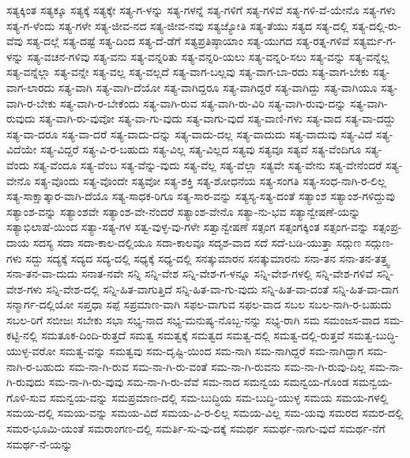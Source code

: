 {ಸತ್ಯಕ್ಕಿಂತ
ಸತ್ಯಕ್ಕೂ
ಸತ್ಯಕ್ಕೆ
ಸತ್ಯಕ್ಕೇ
ಸತ್ಯ-ಗ-ಳನ್ನು
ಸತ್ಯ-ಗಳನ್ನೆ
ಸತ್ಯ-ಗಳಿಗೆ
ಸತ್ಯ-ಗಳಿವೆ
ಸತ್ಯ-ಗಳಿ-ವೆ-ಯೇನೊ
ಸತ್ಯ-ಗಳು
ಸತ್ಯ-ಗ-ಳೆಂದು
ಸತ್ಯ-ಗಳೇ
ಸತ್ಯ-ಜೀವ-ನದ
ಸತ್ಯ-ಜೀವ-ನವು
ಸತ್ಯಜ್ಯೋತಿ
ಸತ್ಯ-ತೆಯು
ಸತ್ಯದ
ಸತ್ಯ-ದಲ್ಲಿ
ಸತ್ಯ-ದಲ್ಲಿ-ರು-ವೆವು
ಸತ್ಯ-ದಲ್ಲೆ
ಸತ್ಯ-ದಷ್ಟೆ
ಸತ್ಯ-ದಿಂದ
ಸತ್ಯ-ದೆ-ಡೆಗೆ
ಸತ್ಯಪ್ರತಿಷ್ಠಾಯಾಂ
ಸತ್ಯ-ಯುಗದ
ಸತ್ಯ-ರತ್ನ-ಗಳಿವೆ
ಸತ್ಯರ್ಮ-ಗ-ಳನ್ನು
ಸತ್ಯ-ವಚನ-ಗಳಿವು
ಸತ್ಯ-ವನು
ಸತ್ಯ-ವನ್ನರಿತು
ಸತ್ಯ-ವನ್ನರಿ-ಯಲು
ಸತ್ಯ-ವನ್ನರಿ-ಸಲು
ಸತ್ಯ-ವನ್ನು
ಸತ್ಯ-ವನ್ನೆಲ್ಲ
ಸತ್ಯ-ವನ್ನೆಲ್ಲಾ
ಸತ್ಯ-ವನ್ನೇ
ಸತ್ಯ-ವಲ್ಲ
ಸತ್ಯ-ವಲ್ಲದೆ
ಸತ್ಯ-ವಾಗ-ಬಲ್ಲವು
ಸತ್ಯ-ವಾಗ-ಬಾ-ರದು
ಸತ್ಯ-ವಾಗ-ಬೇಕು
ಸತ್ಯ-ವಾಗ-ಲಾರದು
ಸತ್ಯ-ವಾಗಿ
ಸತ್ಯ-ವಾಗಿ-ದೆಯೋ
ಸತ್ಯ-ವಾಗಿದ್ದರೂ
ಸತ್ಯ-ವಾಗಿದ್ದರೆ
ಸತ್ಯ-ವಾಗಿದ್ದು
ಸತ್ಯ-ವಾಗಿಯೂ
ಸತ್ಯ-ವಾಗಿ-ರ-ಬೇಕು
ಸತ್ಯ-ವಾಗಿ-ರ-ಬೇಕೆಂದು
ಸತ್ಯ-ವಾಗಿ-ರುವ
ಸತ್ಯ-ವಾಗಿ-ರು-ವಿರಿ
ಸತ್ಯ-ವಾಗಿ-ರುವು-ದನ್ನು
ಸತ್ಯ-ವಾಗಿ-ರುವುದು
ಸತ್ಯ-ವಾಗಿ-ರು-ವುವೋ
ಸತ್ಯ-ವಾ-ಗು-ವುದು
ಸತ್ಯ-ವಾಗು-ವುದೆ
ಸತ್ಯ-ವಾಣಿ-ಗಳು
ಸತ್ಯ-ವಾದ
ಸತ್ಯ-ವಾ-ದದ್ದು
ಸತ್ಯ-ವಾ-ದರೂ
ಸತ್ಯ-ವಾ-ದರೆ
ಸತ್ಯ-ವಾದು-ದನ್ನು
ಸತ್ಯ-ವಾದು-ದಲ್ಲ
ಸತ್ಯ-ವಾದುದು
ಸತ್ಯ-ವಾದುವು
ಸತ್ಯ-ವಿದೆ
ಸತ್ಯ-ವಿದೆಯೇ
ಸತ್ಯ-ವಿದ್ದರೆ
ಸತ್ಯ-ವಿ-ರ-ಬಹುದು
ಸತ್ಯ-ವಿಲ್ಲ
ಸತ್ಯ-ವಿಲ್ಲದ
ಸತ್ಯವು
ಸತ್ಯವೂ
ಸತ್ಯವೆ
ಸತ್ಯ-ವೆಂದಿಗೂ
ಸತ್ಯ-ವೆಂದು
ಸತ್ಯ-ವೆಂದೂ
ಸತ್ಯ-ವೆಂಬ
ಸತ್ಯ-ವೆನ್ನು-ವುದು
ಸತ್ಯ-ವೆಲ್ಲ
ಸತ್ಯ-ವೆಲ್ಲಾ
ಸತ್ಯವೇ
ಸತ್ಯ-ವೇನು
ಸತ್ಯ-ವೇನೆಂದರೆ
ಸತ್ಯ-ವೇನೊ
ಸತ್ಯ-ವೊಂದು
ಸತ್ಯ-ವೊಂದೇ
ಸತ್ಯವೋ
ಸತ್ಯ-ಶಕ್ತಿ
ಸತ್ಯ-ಶೋಧನೆಯ
ಸತ್ಯ-ಸಂಗತಿ
ಸತ್ಯ-ಸಂಧ-ನಾಗಿ-ರ-ಲಿಲ್ಲ
ಸತ್ಯ-ಸಾಕ್ಷಾತ್ಕಾರ-ವಾಗಿ-ದೆಯೊ
ಸತ್ಯ-ಸಾಧಕ-ರಿಗೂ
ಸತ್ಯ-ಸಾರ-ವನ್ನು
ಸತ್ಯಸ್ಯ-ಸತ್ಯ-ದಂತೆ
ಸತ್ಯಾಂಶ
ಸತ್ಯಾಂಶ-ಗಳಿದ್ದುವು
ಸತ್ಯಾಂಶ-ವನ್ನು
ಸತ್ಯಾಂಶವೇ
ಸತ್ಯಾಂಶ-ವೇ-ನೆಂದರೆ
ಸತ್ಯಾಂಶ-ವೇನೊ
ಸತ್ಯಾ-ನು-ಭವ
ಸತ್ಯಾನ್ವೇಷಣೆ-ಯನ್ನು
ಸತ್ಯಾಭಿಲಾಷೆ-ಯಿಂದ
ಸತ್ಯಾ-ಸತ್ಯ-ಗಳ
ಸತ್ವ-ವುಳ್ಳ-ವು-ಗಳೇ
ಸತ್ವಾನ್ವೇಷಣೆ
ಸತ್ಸಂಗ
ಸತ್ಸಂಗಕ್ಕಿಂತ
ಸತ್ಸಂಗ-ವನ್ನು
ಸತ್ಸಂಪ್ರ-ದಾಯ
ಸದಸ್ಯ
ಸದಾ
ಸದಾ-ಕಾಲ-ದಲ್ಲಿಯೂ
ಸದಾ-ಕಾಲವೂ
ಸದೃಶ-ವಾದ
ಸದೆ
ಸದೆ-ಬಡಿ-ಯುತ್ತಾ
ಸದ್ಗುಣ
ಸದ್ಗುಣ-ಗಳು
ಸದ್ದು
ಸದ್ಯಕ್ಕೆ
ಸದ್ಯದ
ಸದ್ಯ-ದಲ್ಲಿ
ಸಧ್ಯಕ್ಕೆ
ಸಧ್ಯ-ದಲ್ಲಿ
ಸನತ್ಕುಮಾರನ
ಸನತ್ಕುಮಾರನು
ಸನಾ-ತನ
ಸನಾ-ತನ-ತತ್ತ್ವ
ಸನಾ-ತನ-ವಾ-ದುದು
ಸನಾತ-ನವೇ
ಸನ್ನಿ
ಸನ್ನಿ-ವೇಶ
ಸನ್ನಿ-ವೇಶ-ಗ-ಳನ್ನೂ
ಸನ್ನಿ-ವೇಶ-ಗಳಲ್ಲಿ
ಸನ್ನಿ-ವೇಶ-ಗಳಿವೆ
ಸನ್ನಿ-ವೇಶ-ಗಳು
ಸನ್ನಿ-ವೇಶ-ದಲ್ಲಿ
ಸನ್ನಿ-ಹಿತ-ವಾಗುತ್ತಿದೆ
ಸನ್ನಿ-ಹಿತ-ವಾ-ಗು-ವುದು
ಸನ್ನಿ-ಹಿತ-ವಾ-ದಂತೆ
ಸನ್ನಿ-ಹಿತ-ವಾ-ದಾಗ
ಸನ್ಮಾರ್ಗ-ದಲ್ಲಿಯೋ
ಸಪ್ತಧಾ
ಸಪ್ಪೆ
ಸಪ್ರಮಾಣ-ವಾಗಿ
ಸಫಲ-ವಾಗುವ
ಸಫಲ-ವಾದ
ಸಬಲ
ಸಬಲ-ನಾಗಿ-ರ-ಬಹುದು
ಸಬಲ-ರಿಗೆ
ಸಬೀಜಃ
ಸಬೇಕು
ಸಭಾ
ಸಭ್ಯ-ನಾದ
ಸಭ್ಯ-ಮನುಷ್ಯ-ನೊಬ್ಬ-ನನ್ನು
ಸಭ್ಯ-ರಾಗಿ
ಸಮ
ಸಮಂಜಸ-ವಾದ
ಸಮ-ಕಟ್ಟಿ-ನಲ್ಲಿ
ಸಮತೂಕ-ದಿಂದಿ-ರುತ್ತದೆ
ಸಮತ್ವ
ಸಮತ್ವಕ್ಕೆ
ಸಮತ್ವದ
ಸಮತ್ವ-ದಲ್ಲಿ
ಸಮತ್ವ-ದಲ್ಲಿ-ರುತ್ತವೆ
ಸಮತ್ವ-ಬುದ್ಧಿ-ಯುಳ್ಳ-ವರೋ
ಸಮತ್ವ-ವನ್ನು
ಸಮತ್ವವು
ಸಮ-ದೃಷ್ಟಿ-ಯಿಂದ
ಸಮ-ನಾಗಿ
ಸಮ-ನಾಗಿದ್ದರೆ
ಸಮ-ನಾಗಿದ್ದಾಗ
ಸಮ-ನಾಗಿ-ರ-ಬಹುದು
ಸಮ-ನಾ-ಗಿ-ರುವ
ಸಮ-ನಾ-ಗಿ-ರು-ವಂತೆ
ಸಮ-ನಾ-ಗಿ-ರುವನು
ಸಮ-ನಾ-ಗಿ-ರುವು-ದಿಲ್ಲ
ಸಮ-ನಾ-ಗಿ-ರುವುದು
ಸಮ-ನಾ-ಗಿ-ರು-ವುವು
ಸಮ-ನಾ-ಗಿ-ರು-ವೆವೆ
ಸಮ-ನಾದ
ಸಮನ್ವಯ
ಸಮನ್ವಯ-ಗೊಂಡ
ಸಮನ್ವಯ-ಗೊಳಿ-ಸುವ
ಸಮನ್ವಯ-ವನ್ನು
ಸಮಪ್ರಮಾಣ-ದಲ್ಲಿ
ಸಮ-ಬುದ್ಧಿಯ
ಸಮ-ಬುದ್ಧಿ-ಯುಳ್ಳ
ಸಮಯ
ಸಮಯ-ಗಳಲ್ಲಿ
ಸಮಯ-ದಲ್ಲಿ
ಸಮಯ-ವನ್ನು
ಸಮಯ-ವಿದೆ
ಸಮಯ-ವಿ-ರ-ಲಿಲ್ಲ
ಸಮಯ-ವಿಲ್ಲ
ಸಮ-ಯವು
ಸಮರದ
ಸಮರ-ದಲ್ಲಿ
ಸಮರ-ಭೂಮಿ-ಯಂತೆ
ಸಮರಾಂಗಣ-ದಲ್ಲಿ
ಸಮರ್ತಿ-ಸು-ವು-ದಕ್ಕೆ
ಸಮರ್ಥ
ಸಮರ್ಥ-ನಾಗು-ವುದೆ
ಸಮರ್ಥ-ನೆಗೆ
ಸಮರ್ಥ-ನೆ-ಯನ್ನು
}
